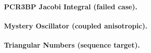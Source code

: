\paragraph{PCR3BP Jacobi Integral (failed case).}

\paragraph{Mystery Oscillator (coupled anisotropic).}

\paragraph{Triangular Numbers (sequence target).}

